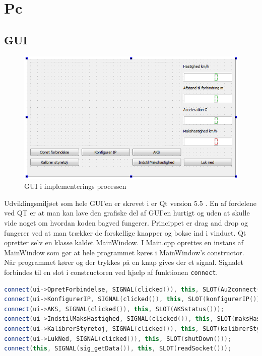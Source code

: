 \section{Pc}
\subsection{GUI}
\begin{figure}[H]
\centering
\includegraphics[width=\textwidth* 3/4,height=\textwidth* 9/20 ]{../fig/billeder/gui_design.png}
\caption{GUI i implementerings processen}
\label{fig:GUI_design}
\end{figure}
Udviklingsmiljøet som hele GUI'en er skrevet i er Qt version 5.5 \cite{lib:qt}. En af fordelene ved QT er at man kan lave den grafiske del af GUI'en hurtigt og uden at skulle vide noget om hvordan koden bagved fungerer. Princippet er drag and drop og fungerer ved at man trækker de forskellige knapper og bokse ind i vinduet. Qt opretter selv en klasse kaldet MainWindow. I Main.cpp oprettes en instans af MainWindow som gør at hele programmet køres i MainWindow's constructor. Når programmet kører og der trykkes på en knap gives der et signal. Signalet forbindes til en slot i constructoren ved hjælp af funktionen \texttt{connect}.
\begin{lstlisting}[caption={Forbindelse af signals og slots},label=gui_connect, language=c++]
connect(ui->OpretForbindelse, SIGNAL(clicked()), this, SLOT(Au2connect()));
connect(ui->KonfigurerIP, SIGNAL(clicked()), this, SLOT(konfigurerIP()));
connect(ui->AKS, SIGNAL(clicked()), this, SLOT(AKSstatus()));
connect(ui->IndstilMaksHastighed, SIGNAL(clicked()), this, SLOT(maksHastighed()));
connect(ui->KalibrerStyretoj, SIGNAL(clicked()), this, SLOT(kalibrerStyretoj()));
connect(ui->LukNed, SIGNAL(clicked()), this, SLOT(shutDown()));
connect(this, SIGNAL(sig_getData()), this, SLOT(readSocket()));
\end{lstlisting}
